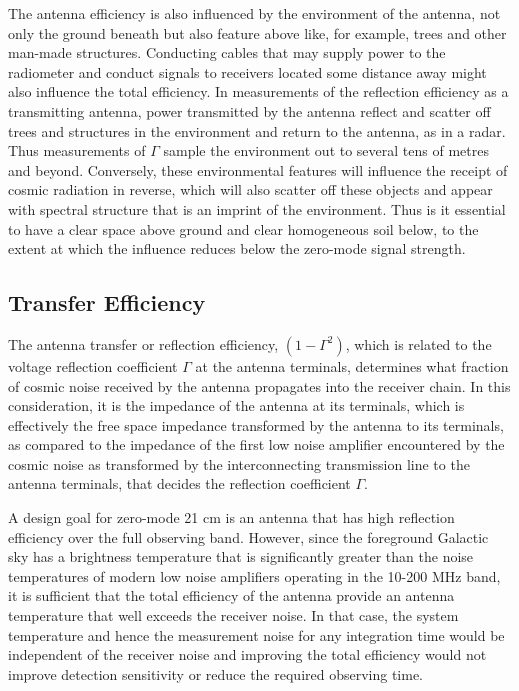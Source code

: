    The antenna efficiency is also influenced by the environment of the antenna, not only the ground beneath but also feature above like, for example, trees and other man-made structures.  Conducting cables that may supply power to the radiometer and conduct signals to receivers located some distance away might also influence the total efficiency.  In measurements of the reflection efficiency as a transmitting antenna, power transmitted by the antenna reflect and scatter off trees and structures in the environment and return to the antenna, as in a radar. Thus measurements of $\Gamma$ sample the environment out to several tens of metres and beyond.  Conversely, these environmental features will influence the receipt of cosmic radiation in reverse, which will also scatter off these objects and appear with spectral structure that is an imprint of the environment.  Thus is it essential to have a clear space above ground and clear homogeneous soil below, to the extent at which the influence reduces below the zero-mode signal strength.

\subsection{Transfer Efficiency}
   
   The antenna transfer or reflection efficiency, $(1-\Gamma^2)$, which is related to the voltage reflection coefficient $\Gamma$ at the antenna terminals, determines what fraction of cosmic noise received by the antenna propagates into the receiver chain.  In this consideration, it is the impedance of the antenna at its terminals, which is effectively the free space impedance transformed by the antenna to its terminals, as compared to the impedance of the first low noise amplifier encountered by the cosmic noise as transformed by the interconnecting transmission line to the antenna terminals, that decides the reflection coefficient $\Gamma$.  
   
   A design goal for zero-mode 21 cm is an antenna that has high reflection efficiency over the full observing band.  However, since the foreground Galactic sky has a brightness temperature that is significantly greater than the noise temperatures of modern low noise amplifiers operating in the 10-200 MHz band, it is sufficient that the total efficiency of the antenna provide an antenna temperature that well exceeds the receiver noise.  In that case, the system temperature and hence the measurement noise for any integration time would be independent of the receiver noise and improving the total efficiency would not improve detection sensitivity or reduce the required observing time.
   
